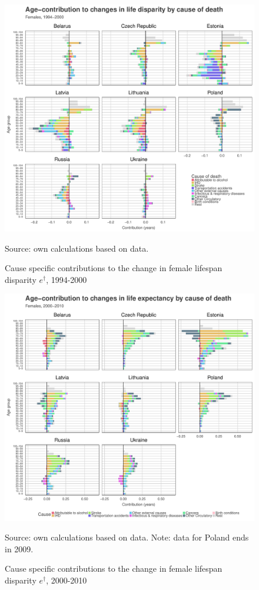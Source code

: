 \documentclass{article}
\begin{document}
\newpage

\begin{figure}[h!]
\caption{Cause specific contributions to the change in  female lifespan disparity  $e^\dagger$, 1994-2000}
\centering
\begin{center}
\includegraphics[scale=.5]{Figures/Cause_ed_decomp_Females_1.pdf}
\end{center}
Source: own calculations based on \citet{HMD} data. 
\end{figure}

\newpage

\begin{figure}[h!]
\caption{Cause specific contributions to the change in  female lifespan disparity  $e^\dagger$, 2000-2010}
\centering
\begin{center}
\includegraphics[scale=.5]{Figures/Cause_ed_decomp_Females_2.pdf}
\end{center}
Source: own calculations based on \citet{HMD} data. Note: data for Poland ends in 2009.
\end{figure}
\end{document}
